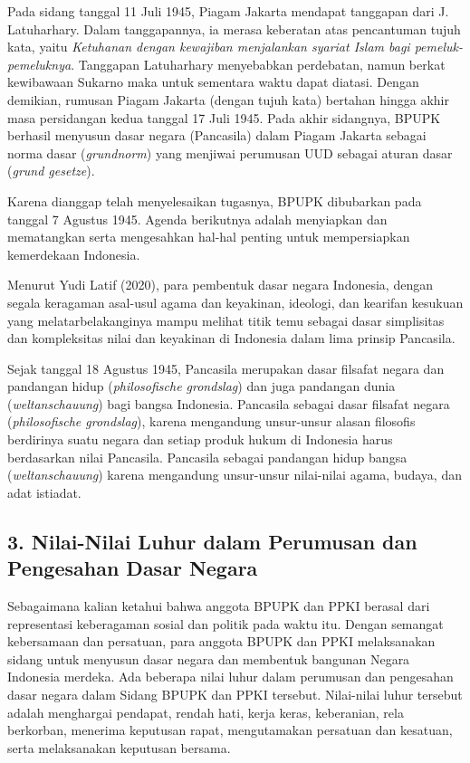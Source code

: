 \documentclass[12pt,a4paper]{article}
\begin{document}
Pada sidang tanggal 11 Juli 1945, Piagam Jakarta mendapat tanggapan dari J. Latuharhary. Dalam tanggapannya, ia merasa keberatan atas pencantuman tujuh kata, yaitu \textit{Ketuhanan dengan kewajiban menjalankan syariat Islam bagi pemeluk-pemeluknya}. Tanggapan Latuharhary menyebabkan perdebatan, namun berkat kewibawaan Sukarno maka untuk sementara waktu dapat diatasi. Dengan demikian, rumusan Piagam Jakarta (dengan tujuh kata) bertahan hingga akhir masa persidangan kedua tanggal 17 Juli 1945. Pada akhir sidangnya, BPUPK berhasil menyusun dasar negara (Pancasila) dalam Piagam Jakarta sebagai norma dasar (\textit{grundnorm}) yang menjiwai perumusan UUD sebagai aturan dasar (\textit{grund gesetze}).

Karena dianggap telah menyelesaikan tugasnya, BPUPK dibubarkan pada tanggal 7 Agustus 1945. Agenda berikutnya adalah menyiapkan dan mematangkan serta mengesahkan hal-hal penting untuk mempersiapkan kemerdekaan Indonesia.

Menurut Yudi Latif (2020), para pembentuk dasar negara Indonesia, dengan segala keragaman asal-usul agama dan keyakinan, ideologi, dan kearifan kesukuan yang melatarbelakanginya mampu melihat titik temu sebagai dasar simplisitas dan kompleksitas nilai dan keyakinan di Indonesia dalam lima prinsip Pancasila.

Sejak tanggal 18 Agustus 1945, Pancasila merupakan dasar filsafat negara dan pandangan hidup (\textit{philosofische grondslag}) dan juga pandangan dunia (\textit{weltanschauung}) bagi bangsa Indonesia. Pancasila sebagai dasar filsafat negara (\textit{philosofische grondslag}), karena mengandung unsur-unsur alasan filosofis berdirinya suatu negara dan setiap produk hukum di Indonesia harus berdasarkan nilai Pancasila. Pancasila sebagai pandangan hidup bangsa (\textit{weltanschauung}) karena mengandung unsur-unsur nilai-nilai agama, budaya, dan adat istiadat.

\subsection*{3. Nilai-Nilai Luhur dalam Perumusan dan Pengesahan Dasar Negara}
Sebagaimana kalian ketahui bahwa anggota BPUPK dan PPKI berasal dari representasi keberagaman sosial dan politik pada waktu itu. Dengan semangat kebersamaan dan persatuan, para anggota BPUPK dan PPKI melaksanakan sidang untuk menyusun dasar negara dan membentuk bangunan Negara Indonesia merdeka. Ada beberapa nilai luhur dalam perumusan dan pengesahan dasar negara dalam Sidang BPUPK dan PPKI tersebut. Nilai-nilai luhur tersebut adalah menghargai pendapat, rendah hati, kerja keras, keberanian, rela berkorban, menerima keputusan rapat, mengutamakan persatuan dan kesatuan, serta melaksanakan keputusan bersama.
\end{document}
